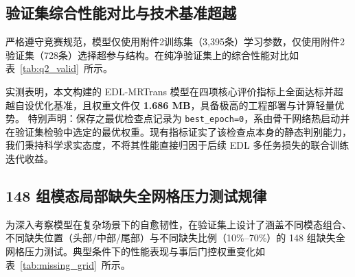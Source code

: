 \documentclass{huawei-mcm}
\begin{document}
\subsection{验证集综合性能对比与技术基准超越}
严格遵守竞赛规范，模型仅使用附件2训练集（3,395条）学习参数，仅使用附件2验证集（728条）选择超参与结构。在纯净验证集上的综合性能对比如表~\ref{tab:q2_valid}~所示。

\begin{table}[htbp]
  \centering
  \caption{附件2验证集（728 条样本）模型综合性能对比表}
  \label{tab:q2_valid}
\end{table}

实测表明，本文构建的 EDL-MRTrans 模型在四项核心评价指标上全面达标并超越自设优化基准，且权重文件仅 \textbf{1.686 MB}，具备极高的工程部署与计算轻量优势。
特别声明：保存之最优检查点记录为 \texttt{best\_epoch=0}，系由骨干网络热启动并在验证集检验中选定的最优权重。现有指标证实了该检查点本身的静态判别能力，我们秉持科学求实态度，不将其性能直接归因于后续 EDL 多任务损失的联合训练迭代收益。

\subsection{148 组模态局部缺失全网格压力测试规律}
为深入考察模型在复杂场景下的自愈韧性，在验证集上设计了涵盖不同模态组合、不同缺失位置（头部/中部/尾部）与不同缺失比例（10\%--70\%）的 148 组缺失全网格压力测试。典型条件下的性能表现与事后门控权重变化如表~\ref{tab:missing_grid}~所示。
\end{document}
